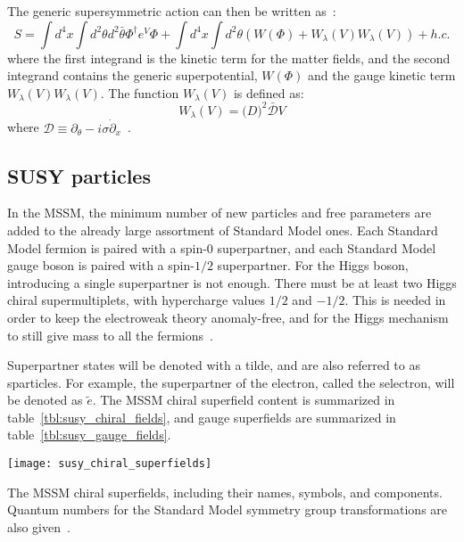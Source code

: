 The generic supersymmetric action can then be written as~\cite{susy-unification-1998}:
\begin{equation}\label{eq:susy_action}
    S = \int d^4 x \int d^2 \theta d^2 \bar{\theta} \Phi^{\dagger} e^V \Phi
        + \int d^4 x \int d^2 \theta \left(W(\Phi) + W_{\lambda}(V)W_{\lambda}(V)\right)+h.c.
\end{equation}
where the first integrand is the kinetic term for the matter fields, and the second integrand contains the generic superpotential, $W(\Phi)$ and the gauge kinetic term $W_{\lambda}(V)W_{\lambda}(V)$.
The function $W_{\lambda}(V)$ is defined as:
\begin{equation}\label{eq:susy_gauge_potential}
    W_{\lambda}(V) = \mathcal(D)^{2}\bar{\mathcal{D}}V
\end{equation}
where $\mathcal{D} \equiv \partial_{\theta}-i\sigma\dot \partial_x$~\cite{susy-unification-1998}.

\subsection{SUSY particles}\label{subsec:susy_mssm}
In the MSSM, the minimum number of new particles and free parameters are added to the already large assortment of Standard Model ones.
Each Standard Model fermion is paired with a spin-$0$ superpartner, and each Standard Model gauge boson is paired with a spin-$1/2$ superpartner.
For the Higgs boson, introducing a single superpartner is not enough.
There must be at least two Higgs chiral supermultiplets, with hypercharge values $1/2$ and $-1/2$.
This is needed in order to keep the electroweak theory anomaly-free, and for the Higgs mechanism to still give mass to all the fermions~\cite{susy-primer-1998}.

Superpartner states will be denoted with a tilde, and are also referred to as sparticles.
For example, the superpartner of the electron, called the selectron, will be denoted as $\tilde{e}$.
The MSSM chiral superfield content is summarized in table~\ref{tbl:susy_chiral_fields},
and gauge superfields are summarized in table~\ref{tbl:susy_gauge_fields}.
\begin{table}[!ht]
    \centering
  \texttt{[image: susy\_chiral\_superfields]}
    \caption{The MSSM chiral superfields, including their names, symbols, and components.
  Quantum numbers for the Standard Model symmetry group transformations are also given~\cite{susy-primer-1998}.}
    \label{tbl:susy_chiral_fields}
\end{table}

